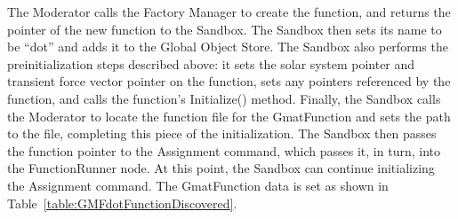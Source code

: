The Moderator calls the Factory Manager to create the function, and returns the pointer of the new
function to the Sandbox.  The Sandbox then sets its name to be ``dot'' and adds it to the Global
Object Store.  The Sandbox also performs the preinitialization steps described above: it sets the
solar system pointer and transient force vector pointer on the function, sets any pointers
referenced by the function, and calls the function's Initialize() method.  Finally, the Sandbox
calls the Moderator to locate the function file for the GmatFunction and sets the path to the file,
completing this piece of the initialization.  The Sandbox then passes the function pointer to the
Assignment command, which passes it, in turn, into the FunctionRunner node.  At this point, the
Sandbox can continue initializing the Assignment command.  The GmatFunction data is set as
shown in Table~\ref{table:GMFdotFunctionDiscovered}.

